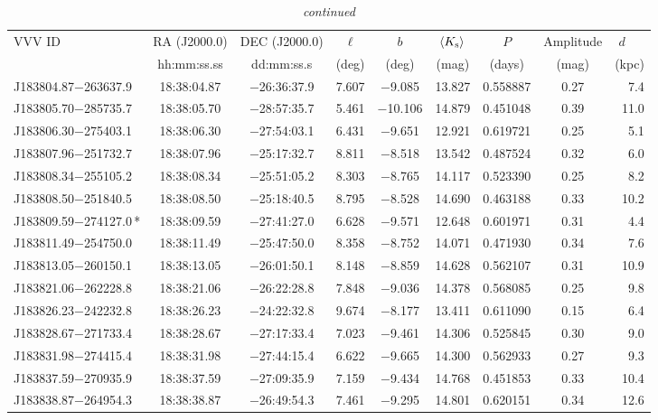 \begin{table*}
\centering
\caption[]{{\it continued}}
\begin{tabular}{lcccccccr}
\hline \hline
VVV ID & RA (J2000.0)  & DEC (J2000.0) & $\ell$ & $b$ &  $\langle K_{\rm s} \rangle$ & $P$ & Amplitude & $d$~~~ \\
     & hh:mm:ss.ss    & dd:mm:ss.s   &  (deg) & (deg) &   (mag)       & (days) & (mag) & (kpc)   \\
\hline
J183804.87$-$263637.9 & 18:38:04.87 & $-$26:36:37.9 &  7.607 & $-$9.085 & 13.827 & 0.558887 & 0.27 & 7.4 \\
J183805.70$-$285735.7 & 18:38:05.70 & $-$28:57:35.7 &  5.461 & $-$10.106 & 14.879 & 0.451048 & 0.39 & 11.0 \\
J183806.30$-$275403.1 & 18:38:06.30 & $-$27:54:03.1 &  6.431 & $-$9.651 & 12.921 & 0.619721 & 0.25 & 5.1 \\
J183807.96$-$251732.7 & 18:38:07.96 & $-$25:17:32.7 &  8.811 & $-$8.518 & 13.542 & 0.487524 & 0.32 & 6.0 \\
J183808.34$-$255105.2 & 18:38:08.34 & $-$25:51:05.2 &  8.303 & $-$8.765 & 14.117 & 0.523390 & 0.25 & 8.2 \\
J183808.50$-$251840.5 & 18:38:08.50 & $-$25:18:40.5 &  8.795 & $-$8.528 & 14.690 & 0.463188 & 0.33 & 10.2 \\
J183809.59$-$274127.0\,* & 18:38:09.59 & $-$27:41:27.0 &  6.628 & $-$9.571 & 12.648 & 0.601971 & 0.31 & 4.4 \\
J183811.49$-$254750.0 & 18:38:11.49 & $-$25:47:50.0 &  8.358 & $-$8.752 & 14.071 & 0.471930 & 0.34 & 7.6 \\
J183813.05$-$260150.1 & 18:38:13.05 & $-$26:01:50.1 &  8.148 & $-$8.859 & 14.628 & 0.562107 & 0.31 & 10.9 \\
J183821.06$-$262228.8 & 18:38:21.06 & $-$26:22:28.8 &  7.848 & $-$9.036 & 14.378 & 0.568085 & 0.25 & 9.8 \\
J183826.23$-$242232.8 & 18:38:26.23 & $-$24:22:32.8 &  9.674 & $-$8.177 & 13.411 & 0.611090 & 0.15 & 6.4 \\
J183828.67$-$271733.4 & 18:38:28.67 & $-$27:17:33.4 &  7.023 & $-$9.461 & 14.306 & 0.525845 & 0.30 & 9.0 \\
J183831.98$-$274415.4 & 18:38:31.98 & $-$27:44:15.4 &  6.622 & $-$9.665 & 14.300 & 0.562933 & 0.27 & 9.3 \\
J183837.59$-$270935.9 & 18:38:37.59 & $-$27:09:35.9 &  7.159 & $-$9.434 & 14.768 & 0.451853 & 0.33 & 10.4 \\
J183838.87$-$264954.3 & 18:38:38.87 & $-$26:49:54.3 &  7.461 & $-$9.295 & 14.801 & 0.620151 & 0.34 & 12.6 \\

\end{tabular}
\end{table*}
